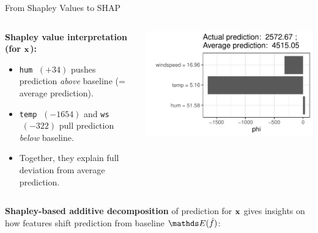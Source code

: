 \documentclass[10pt,compress,t,notes=noshow, xcolor=table]{beamer}
\begin{document}
\begin{frame}{From Shapley Values to SHAP}


\begin{columns}[T, onlytextwidth]
\begin{column}{0.51\textwidth}




\textbf{Shapley value interpretation (for $\mathbf{x}$):}
\begin{itemize}
  \item \texttt{hum} \(\;(+34)\) pushes prediction \emph{above} baseline (= average prediction).  
  \item \texttt{temp} \(\;(-1654)\) and \texttt{ws} \(\;(-322)\) pull prediction \emph{below} baseline.
  \item Together, they explain full deviation from average prediction.
\end{itemize}




\end{column}
\begin{column}{0.49\textwidth}
\includegraphics[trim={10 17 5 5},clip, width=\linewidth]{figure/shapley2shap.pdf}
\end{column}
\end{columns}
\pause
\textbf{Shapley-based additive decomposition} of prediction for $\mathbf{x}$ gives insights on how features shift prediction from baseline $\E(\fh)$:


\end{frame}
\end{document}
